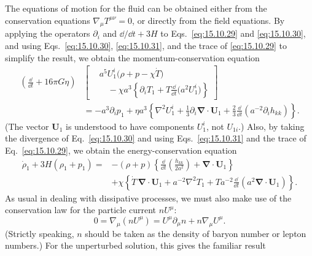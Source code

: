 The equations of motion for the fluid can be obtained either from the
conservation equations \(\nabla_\mu T^{\mu\nu}=0\), or directly from the
field equations. By applying the operators \(\partial_i\) and
\(\dd/\dd t+3H\) to Eqs.~\eqref{eq:15.10.29} and
\eqref{eq:15.10.30}, and using Eqs.~\eqref{eq:15.10.30},
\eqref{eq:15.10.31}, and the trace of \eqref{eq:15.10.29} to simplify the
result, we obtain the momentum-conservation equation
\begin{equation}
  \begin{aligned}
  \left(\frac{\dd}{\dd t}+16\pi G\eta\right)
  &\left[
    \begin{aligned}
      &a^5U_1^i\bigl(\rho+p-\chi\dot T\bigr)\\[-0.2em]
      &\quad-\chi a^3
      \left\{
        \partial_iT_1
        +T\frac{\dd}{\dd t}\bigl(a^2U_1^i\bigr)
      \right\}
    \end{aligned}
  \right]\\
  &=
  -a^3\partial_i p_1
  +\eta a^3
  \left\{
    \nabla^2U_1^i
    +\frac13\partial_i
      \boldsymbol{\nabla}\cdot\mathbf U_1
    +\frac23\frac{\dd}{\dd t}
      \left(a^{-2}\partial_i h_{kk}\right)
  \right\}.
  \end{aligned}
  \tag{15.10.32}\label{eq:15.10.32}
\end{equation}
(The vector \(\mathbf U_1\) is understood to have components \(U_1^i\),
not \(U_{1i}\).) Also, by taking the divergence of
Eq.~\eqref{eq:15.10.30} and using Eqs.~\eqref{eq:15.10.31} and the trace
of Eq.~\eqref{eq:15.10.29}, we obtain the energy-conservation equation
\begin{equation}
  \begin{split}
  \dot\rho_1+3H(\rho_1+p_1)
  ={}&
  -(\rho+p)
  \left\{
    \frac{\dd}{\dd t}\left(\frac{h_{kk}}{2a^2}\right)
    +\boldsymbol{\nabla}\cdot\mathbf U_1
  \right\}\\
  &+\chi
  \left\{
    \dot T\,\boldsymbol{\nabla}\cdot\mathbf U_1
    +a^{-2}\nabla^2T_1
    +Ta^{-2}\frac{\dd}{\dd t}
      \left(a^2\boldsymbol{\nabla}\cdot\mathbf U_1\right)
  \right\}.
  \end{split}
  \tag{15.10.33}\label{eq:15.10.33}
\end{equation}
As usual in dealing with dissipative processes, we must also make use of the
conservation law for the particle current \(nU^\mu\):
\[
  0=\nabla_\mu(nU^\mu)
  =U^\mu\partial_\mu n+n\nabla_\mu U^\mu.
\]
(Strictly speaking, \(n\) should be taken as the density of baryon number or
lepton numbers.) For the unperturbed solution, this gives the familiar result
